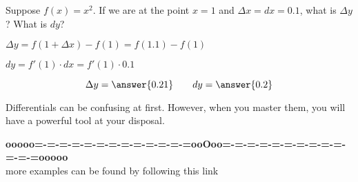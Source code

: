 \documentclass{ximera}
\begin{document}
\begin{question}
  Suppose $f(x) = x^2$. If we are at the point $x=1$ and $\Delta x =dx
  = 0.1$, what is $\Delta y$? What is $dy$?
  \begin{hint}
 $ \Delta y=f(1+\Delta x)-f(1)=f(1.1)-f(1)$
    \end{hint}
      \begin{hint}
 $dy=f'(1)\cdot dx=f'(1)\cdot0.1$
    \end{hint}
  \begin{prompt}
    \[
    \Delta y = \answer{0.21}\qquad dy = \answer{0.2}
    \]
  \end{prompt}
\end{question}
Differentials can be confusing at first. However, when you master
them, you will have a powerful tool at your disposal.










\begin{center}
\textbf{\textcolor{green!50!black}{ooooo=-=-=-=-=-=-=-=-=-=-=-=-=ooOoo=-=-=-=-=-=-=-=-=-=-=-=-=ooooo}} \\

more examples can be found by following this link\\ 

\end{center}
\end{document}
